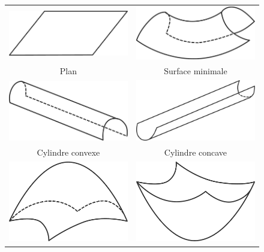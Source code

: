 \begin{figure}[ht]
  \begin{center}
    \setlength{\tabcolsep}{0.5cm}
    \begin{tabular}{cc}
      \includegraphics[width=5.5cm]{figures/curv_plan} &
      \includegraphics[width=5.5cm]{figures/curv_minimal}
      \\
      Plan &
      Surface minimale
      \\
      \includegraphics[width=5.5cm]{figures/curv_cylindre_conv} &
      \includegraphics[width=5.5cm]{figures/curv_cylindre_conc}
      \\
      Cylindre convexe &
      Cylindre concave
      \\
      \includegraphics[width=5.5cm]{figures/curv_pic} &
      \includegraphics[width=5.5cm]{figures/curv_vallee}

\end{tabular}
\end{center}
\end{figure}
